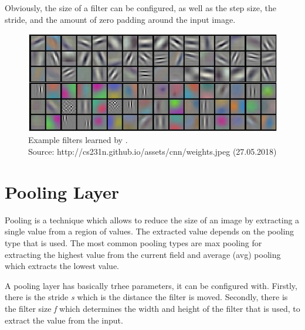 Obviously, the size of a filter can be configured, as well as the step size, the stride, and the amount of zero padding around the input image.

\begin{figure}[H]
    \centering
	\includegraphics[width=0.6\linewidth]{chapters/neural_networks/images/example_filters.jpeg}
	\caption{Example filters learned by \cite{Krizhevsky.2012}.\\ Source: http://cs231n.github.io/assets/cnn/weights.jpeg (27.05.2018)}
	\label{fig:neural_networks:example_filters}
\end{figure}

\section{Pooling Layer}
Pooling is a technique which allows to reduce the size of an image by extracting a single value from a region of values. The extracted value depends on the pooling type that is used. The most common pooling types are max pooling for extracting the highest value from the current field and average (avg) pooling which extracts the lowest value.

A pooling layer has basically trhee parameters, it can be configured with. Firstly, there is the stride \textit{s} which is the distance the filter is moved. Secondly, there is the filter size \textit{f} which determines the width and height of the filter that is used, to extract the value from the input.

